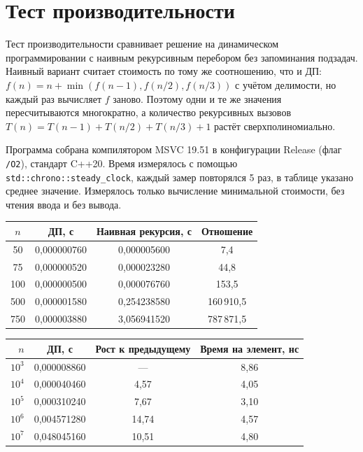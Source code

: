 \section{Тест производительности}
Тест производительности сравнивает решение на динамическом программировании с наивным рекурсивным перебором без запоминания подзадач.
Наивный вариант считает стоимость по тому же соотношению, что и ДП: $f(n) = n + \min(f(n-1), f(n/2), f(n/3))$ с учётом делимости,
но каждый раз вычисляет $f$ заново. Поэтому одни и те же значения пересчитываются многократно, а количество рекурсивных вызовов
$T(n) = T(n-1) + T(n/2) + T(n/3) + 1$ растёт сверхполиномиально.

Программа собрана компилятором MSVC 19.51 в конфигурации Release (флаг \texttt{/O2}), стандарт C++20.
Время измерялось с помощью \texttt{std::chrono::steady\_clock}, каждый замер повторялся 5 раз,
в таблице указано среднее значение. Измерялось только вычисление минимальной стоимости, без чтения ввода и без вывода.

\begin{table}[h]
\centering
\begin{tabular}{|c|c|c|c|}
\hline
$n$ & ДП, с & Наивная рекурсия, с & Отношение \\
\hline
50  & 0{,}000000760 & 0{,}000005600 & 7{,}4 \\
75  & 0{,}000000520 & 0{,}000023280 & 44{,}8 \\
100 & 0{,}000000500 & 0{,}000076760 & 153{,}5 \\
500 & 0{,}000001580 & 0{,}254238580 & 160\,910{,}5 \\
750 & 0{,}000003880 & 3{,}056941520 & 787\,871{,}5 \\
\hline
\end{tabular}
\end{table}

\begin{table}[h]
\centering
\begin{tabular}{|r|c|c|c|}
\hline
$n$ & ДП, с & Рост к предыдущему & Время на элемент, нс \\
\hline
$10^3$ & 0{,}000008860 & --- & 8{,}86 \\
$10^4$ & 0{,}000040460 & 4{,}57 & 4{,}05 \\
$10^5$ & 0{,}000310240 & 7{,}67 & 3{,}10 \\
$10^6$ & 0{,}004571280 & 14{,}74 & 4{,}57 \\
$10^7$ & 0{,}048045160 & 10{,}51 & 4{,}80 \\
\hline
\end{tabular}
\end{table}

